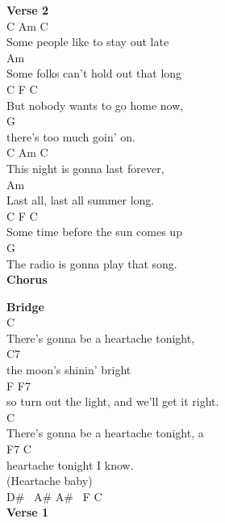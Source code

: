 \documentclass[a4paper]{article}
\begin{document}
{{        }
        \textbf{Verse 2}
        ~\\
        {
            \cutive
            \obeyspaces
C                   Am           C
\\
Some people like to stay out late 
\\
                               Am
\\
Some folks can't hold out that long 
\\
    C               F            C
\\
But nobody wants to go home now, 
\\
                       G
\\
there's too much goin' on. 
\\
C                   Am          C
\\
This night is gonna last forever, 
\\
                          Am
\\
Last all, last all summer long. 
\\
C                    F            C
\\
Some time before the sun comes up 
\\
                   G
\\
The radio is gonna play that song. 
\\

        }
        \textbf{Chorus}
        ~\\
        {
            \cutive
            \obeyspaces

        }
        \textbf{Bridge}
        ~\\
        {
            \cutive
            \obeyspaces
                   C
\\
There's gonna be a heartache tonight, 
\\
    C7
\\
the moon's shinin' bright 
\\
   F                       F7
\\
so turn out the light, and we'll get it right. 
\\
                   C
\\
There's gonna be a heartache tonight, a 
\\
F7                  C
\\
heartache tonight I know. 
\\
(Heartache baby)
\\
D\# \ A\#  A\# \ F   C
\\

        }
        \textbf{Verse 1}
        ~\\
        {
            \cutive
            \obeyspaces

}}
\end{document}
